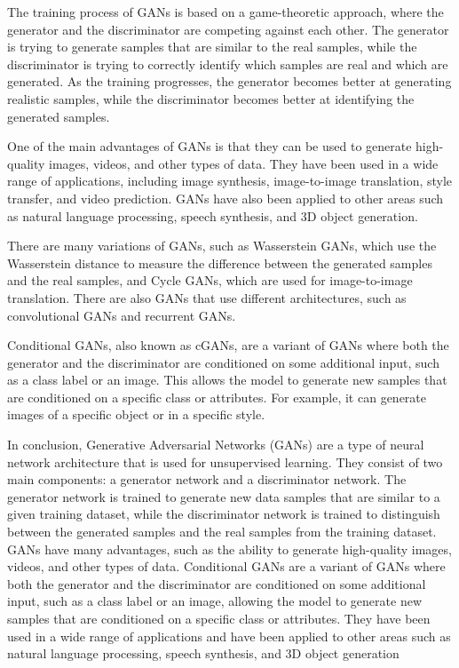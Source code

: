 The training process of GANs is based on a game-theoretic approach, where the generator and the discriminator are competing against each other. The generator is trying to generate samples that are similar to the real samples, while the discriminator is trying to correctly identify which samples are real and which are generated. As the training progresses, the generator becomes better at generating realistic samples, while the discriminator becomes better at identifying the generated samples.

One of the main advantages of GANs is that they can be used to generate high-quality images, videos, and other types of data. They have been used in a wide range of applications, including image synthesis, image-to-image translation, style transfer, and video prediction. GANs have also been applied to other areas such as natural language processing, speech synthesis, and 3D object generation.

There are many variations of GANs, such as Wasserstein GANs, which use the Wasserstein distance to measure the difference between the generated samples and the real samples, and Cycle GANs, which are used for image-to-image translation. There are also GANs that use different architectures, such as convolutional GANs and recurrent GANs.

Conditional GANs, also known as cGANs, are a variant of GANs where both the generator and the discriminator are conditioned on some additional input, such as a class label or an image. This allows the model to generate new samples that are conditioned on a specific class or attributes. For example, it can generate images of a specific object or in a specific style.

In conclusion, Generative Adversarial Networks (GANs) are a type of neural network architecture that is used for unsupervised learning. They consist of two main components: a generator network and a discriminator network. The generator network is trained to generate new data samples that are similar to a given training dataset, while the discriminator network is trained to distinguish between the generated samples and the real samples from the training dataset. GANs have many advantages, such as the ability to generate high-quality images, videos, and other types of data. Conditional GANs are a variant of GANs where both the generator and the discriminator are conditioned on some additional input, such as a class label or an image, allowing the model to generate new samples that are conditioned on a specific class or attributes. They have been used in a wide range of applications and have been applied to other areas such as natural language processing, speech synthesis, and 3D object generation

